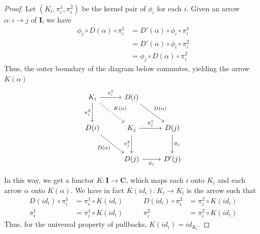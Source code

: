 \documentclass[runningheads,envcountsect]{llncs}
\newcommand{\cat}[1]{\ensuremath{\mathbf{#1}}}
\begin{document}
\begin{proof}
    Let $(K_i, \pi_i^1, \pi_i^2)$ be the kernel pair of $\phi_i$ for each $i$. Given an arrow $\alpha: i \to j$ of $\cat I$, we have
    \begin{align*}
        \phi_j \circ D(\alpha) \circ \pi_i^1 &= D'(\alpha) \circ \phi_i \circ \pi_i^1 \\
                                             &= D'(\alpha) \circ \phi_i \circ \pi_i^2 \\
                                             &= \phi_j \circ D(\alpha) \circ \pi_i^2
    \end{align*}
    Thus, the outer boundary of the diagram below commutes, yielding the arrow $K(\alpha)$
    \[
        \begin{tikzcd}[row sep=26, column sep=26]
            {K_i} \ar[r, "{\pi_i^1}"] \ar[d, "{\pi_i^2}"swap] \ar[dr, dashed, "{K(\alpha)}"] & D(i) \ar[dr, "{D(\alpha)}"] \\
            D(i) \ar[dr, "{D(\alpha)}"swap] & K_j \ar[r, "{\pi_j^1}"] \ar[d, "{\pi_j^2}"swap] & D(j) \ar[d, "{\phi_j}"] \\
            & D(j) \ar[r, "{\phi_j}"swap] & D'(j)
        \end{tikzcd}
    \]

    In this way, we get a functor $K: \cat{I \to C}$, 
    which maps each $i$ onto $K_i$ and each arrow $\alpha$ onto $K(\alpha)$. 
	We have in fact $K(id_i) : K_i \to K_i$ is the arrow such that
        \[
            \begin{split}
                D(id_i) \circ \pi_i^1 &= \pi_i^1 \circ K(id_i) \\
                \pi_i^1 &= \pi_i^1 \circ K(id_i)
            \end{split}
                \qquad
            \begin{split}
                D(id_i) \circ \pi_i^2 &= \pi_i^2 \circ K(id_i) \\
                \pi_i^2 &= \pi_i^2 \circ K(id_i)
            \end{split}
        \]
	Thus, for the universal property of pullbacks, $K(id_i) = id_{K_i}$.


\end{proof}
\end{document}
